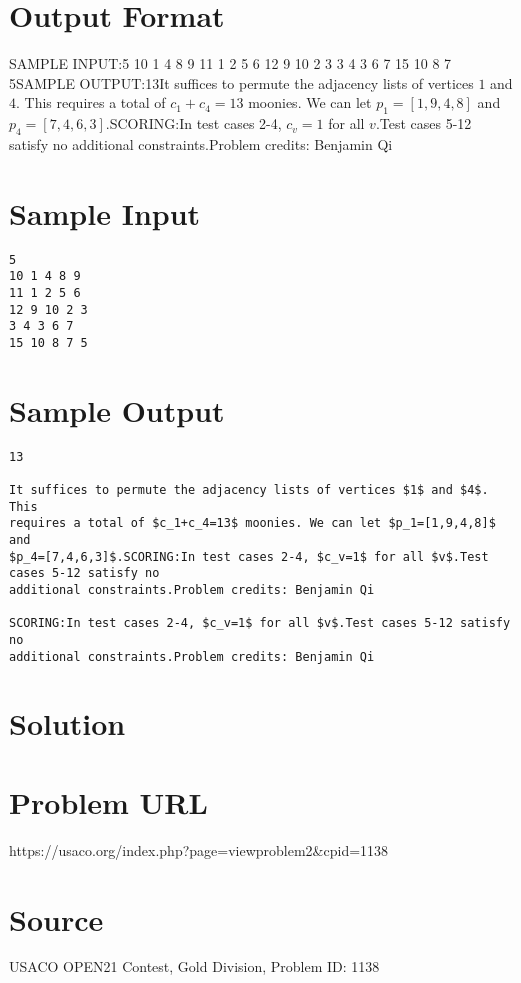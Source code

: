 \documentclass[12pt]{article}
\begin{document}
\section*{Output Format}
SAMPLE INPUT:5
10 1 4 8 9
11 1 2 5 6
12 9 10 2 3
3 4 3 6 7
15 10 8 7 5SAMPLE OUTPUT:13It suffices to permute the adjacency lists of vertices $1$ and $4$. This
requires a total of $c_1+c_4=13$ moonies. We can let $p_1=[1,9,4,8]$ and
$p_4=[7,4,6,3]$.SCORING:In test cases 2-4, $c_v=1$ for all $v$.Test cases 5-12 satisfy no
additional constraints.Problem credits: Benjamin Qi

\section*{Sample Input}
\begin{verbatim}
5
10 1 4 8 9
11 1 2 5 6
12 9 10 2 3
3 4 3 6 7
15 10 8 7 5
\end{verbatim}

\section*{Sample Output}
\begin{verbatim}
13

It suffices to permute the adjacency lists of vertices $1$ and $4$. This
requires a total of $c_1+c_4=13$ moonies. We can let $p_1=[1,9,4,8]$ and
$p_4=[7,4,6,3]$.SCORING:In test cases 2-4, $c_v=1$ for all $v$.Test cases 5-12 satisfy no
additional constraints.Problem credits: Benjamin Qi

SCORING:In test cases 2-4, $c_v=1$ for all $v$.Test cases 5-12 satisfy no
additional constraints.Problem credits: Benjamin Qi
\end{verbatim}

\section*{Solution}


\section*{Problem URL}
https://usaco.org/index.php?page=viewproblem2&cpid=1138

\section*{Source}
USACO OPEN21 Contest, Gold Division, Problem ID: 1138
\end{document}
